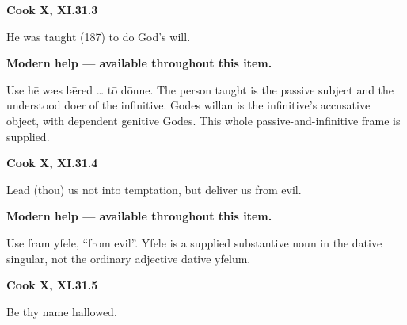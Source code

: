 \par\begin{minipage}{\linewidth}\raggedright
\textbf{Cook X, XI.31.3}

He was taught (187) to do God’s will.

\textbf{Modern help — available throughout this item.}

\end{minipage}\par\addvspace{4pt}

Use hē wæs lǣred … tō dōnne. The person taught is the passive subject and the understood doer of the infinitive. Godes willan is the infinitive’s accusative object, with dependent genitive Godes. This whole passive-and-infinitive frame is supplied.

\par\begin{minipage}{\linewidth}\raggedright
\textbf{Cook X, XI.31.4}

Lead (thou) us not into temptation, but deliver us from evil.

\textbf{Modern help — available throughout this item.}

\end{minipage}\par\addvspace{4pt}

Use fram yfele, “from evil”. Yfele is a supplied substantive noun in the dative singular, not the ordinary adjective dative yfelum.

\par\begin{minipage}{\linewidth}\raggedright
\textbf{Cook X, XI.31.5}

Be thy name hallowed.

\end{minipage}\par\addvspace{4pt}

